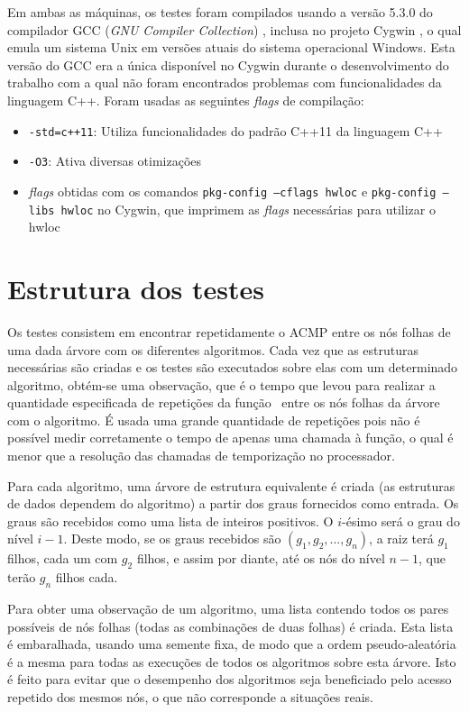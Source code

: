 Em ambas as máquinas, os testes foram compilados usando a versão 5.3.0 do compilador GCC (\textit{GNU Compiler Collection}) \cite{gcc}, inclusa no projeto Cygwin \cite{cygwin}, o qual emula um sistema Unix em versões atuais do sistema operacional Windows.
Esta versão do GCC era a única disponível no Cygwin durante o desenvolvimento do trabalho com a qual não foram encontrados problemas com funcionalidades da linguagem C++.
Foram usadas as seguintes \textit{flags} de compilação:
\begin{itemize}
	\item \texttt{-std=c++11}: Utiliza funcionalidades do padrão C++11 da linguagem C++
	\item \texttt{-O3}: Ativa diversas otimizações
	\item \textit{flags} obtidas com os comandos \texttt{pkg-config --cflags hwloc} e \texttt{pkg-config --libs hwloc} no Cygwin, que imprimem as \textit{flags} necessárias para utilizar o hwloc
\end{itemize}
%


\section{Estrutura dos testes}

Os testes consistem em encontrar repetidamente o ACMP entre os nós folhas de uma dada árvore com os diferentes algoritmos.
Cada vez que as estruturas necessárias são criadas e os testes são executados sobre elas com um determinado algoritmo, obtém-se uma observação, que é o tempo que levou para realizar a quantidade especificada de repetições da função \fACMP\ entre os nós folhas da árvore com o algoritmo.
É usada uma grande quantidade de repetições pois não é possível medir corretamente o tempo de apenas uma chamada à função, o qual é menor que a resolução das chamadas de temporização no processador.

Para cada algoritmo, uma árvore de estrutura equivalente é criada (as estruturas de dados dependem do algoritmo) a partir dos graus fornecidos como entrada.
Os graus são recebidos como uma lista de inteiros positivos.
O $i$-ésimo será o grau do nível $i-1$.
Deste modo, se os graus recebidos são $(g_1, g_2, ..., g_n)$, a raiz terá $g_1$ filhos, cada um com $g_2$ filhos, e assim por diante, até os nós do nível $n-1$, que terão $g_n$ filhos cada.

Para obter uma observação de um algoritmo, uma lista contendo todos os pares possíveis de nós folhas (todas as combinações de duas folhas) é criada.
Esta lista é embaralhada, usando uma semente fixa, de modo que a ordem pseudo-aleatória é a mesma para todas as execuções de todos os algoritmos sobre esta árvore.
Isto é feito para evitar que o desempenho dos algoritmos seja beneficiado pelo acesso repetido dos mesmos nós, o que não corresponde a situações reais.

